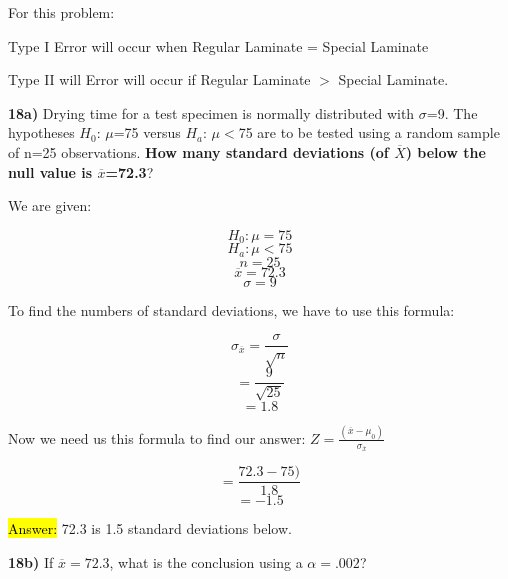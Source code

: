 \documentclass{article}
\begin{document}
\vspace{2mm}

For this problem:

\vspace{2mm}

Type I Error will occur when Regular Laminate = Special Laminate 


\vspace{2mm}

Type II will Error will occur if Regular Laminate $>$ Special Laminate.



\newpage
\textbf{18a)} Drying time for a test specimen is normally distributed with $\sigma$=9. The hypotheses $H_{0}$: $\mu$=75 versus $H_{a}$: $\mu<$75 are to be tested using a random sample of n=25 observations. \textbf{How many standard deviations (of $\overline{X}$) below the null value is $\overline{x}$=72.3}?

\vspace{2mm}

We are given: 

\vspace{2mm}

$$H_{0}: \mu=75$$
$$H_{a}: \mu<75$$
$$n=25$$ 
$$\overline{x}=72.3$$
$$\sigma=9$$

To find the numbers of standard deviations, we have to use this formula:

\vspace{2mm}

$$\sigma_{\overline{x}}=\frac{\sigma}{\sqrt{n}}$$
$$=\frac{9}{\sqrt{25}}$$
$$=1.8$$

Now we need us this formula to find our answer: $Z=\frac{(\overline{x}-\mu_{0})}{\sigma_{\overline{x}}}$

\vspace{2mm}

$$=\frac{72.3-75)}{1.8}$$
$$=-1.5$$

\vspace{2mm}

\hl{Answer:} 72.3 is 1.5 standard deviations below.


\vspace{5mm}


\textbf{18b)} If $\overline{x}=72.3$, what is the conclusion using a $\alpha=.002$?

\vspace{2mm}
\end{document}
